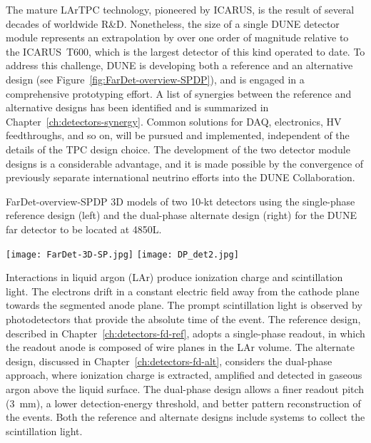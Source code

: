 The mature LArTPC technology, pioneered by ICARUS, is the result of
several decades of worldwide R\&D.  Nonetheless, the size of a single
 DUNE detector module represents an extrapolation by over
one order of magnitude relative to the ICARUS~T600, which is the
largest detector of this kind operated to date. To address this
challenge, DUNE is developing both a reference and an alternative
design (see Figure~\ref{fig:FarDet-overview-SPDP}), and is engaged in
a comprehensive prototyping effort.  A list of synergies between the
reference and alternative designs has been identified and is
summarized in Chapter~\ref{ch:detectors-synergy}. Common solutions for
DAQ, electronics, HV feedthroughs, and so on, will be pursued and
implemented, independent of the details of the TPC design choice. The
development of the two detector module designs is a considerable
advantage, and it is made possible by the convergence of previously
separate international neutrino efforts into the DUNE Collaboration.
\begin{cdrfigure}{FarDet-overview-SPDP}
{3D models of two 10-kt detectors using the single-phase reference design (left) 
and the dual-phase alternate design (right) for the DUNE far detector to be 
located at 4850L.}
\centering
\begin{minipage}[b]{1.0\textwidth}
\begin{center}
\texttt{[image: FarDet-3D-SP.jpg]}
\texttt{[image: DP\_det2.jpg]}
\end{center}
\end{minipage}
\end{cdrfigure}

Interactions in liquid argon (LAr) produce ionization charge and
scintillation light.  The electrons drift in a constant electric field
away from the cathode plane towards the segmented anode plane.  The
prompt scintillation light is observed by photodetectors that provide
the absolute time of the event.  The reference design, described in
Chapter~\ref{ch:detectors-fd-ref}, adopts a single-phase readout, in
which the readout anode is composed of wire planes in the LAr volume.
The alternate design, discussed in Chapter~\ref{ch:detectors-fd-alt},
considers the dual-phase approach, where ionization charge is
extracted, amplified and detected in gaseous argon above the liquid
surface.  The dual-phase design allows a finer readout pitch (3~mm), a
lower detection-energy threshold, and better pattern reconstruction of
the events.  Both the reference and alternate designs include systems
to collect the scintillation light.


